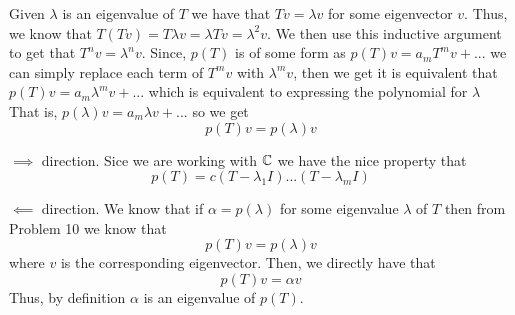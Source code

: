 \documentclass[10pt, twocolumn]{article}
\begin{document}
\begin{q}[10]
    Given $ \lambda $ is an eigenvalue of $ T $ we have that $ Tv = \lambda v $ for some eigenvector $ v $. 
    Thus, we know that $ T(Tv) = T \lambda v = \lambda Tv = \lambda^2 v $. We then use this inductive argument to get that $ T^n v = \lambda^n v $.
    Since, $ p(T) $ is of some form as $ p(T)v = a_m T^mv + ... $ we can simply replace each term of $ T^mv $ with $ \lambda^m v$, 
    then we get it is equivalent that $ p(T)v = a_m \lambda^m v + ...  $ which is equivalent to expressing the polynomial for $ \lambda $ 
    That is, $ p(\lambda)v = a_m \lambda v + ... $ so we get 
    $$ p(T)v = p(\lambda)v $$
\end{q}
\begin{q}[11]
    $ \implies $ direction.
    Sice we are working with $ \mathbb{C} $ we have the nice property that 
    $$ p(T) = c(T - \lambda_1 I)...(T - \lambda_m I) $$

    $ \impliedby $ direction. 
    We know that if $ \alpha = p(\lambda) $ for some eigenvalue $ \lambda $ of $ T $ then from Problem 10 we know that 
    $$ p(T) v = p(\lambda) v $$
    where $ v $ is the corresponding eigenvector.
    Then, we directly have that 
    $$ p(T) v = \alpha v $$
    Thus, by definition $ \alpha $ is an eigenvalue of $ p(T) $.
\end{q}
\end{document}
